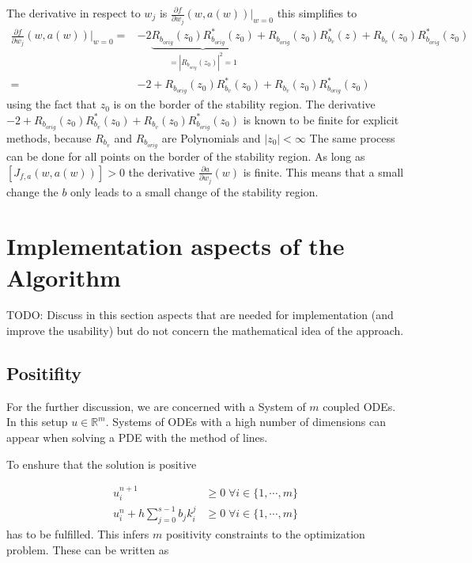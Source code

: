 \documentclass[a4paper]{scrartcl}
\numberwithin{equation}{section}
\theoremstyle{plain}
\theoremstyle{definition}
\numberwithin{theorem}{section}
\newcommand{\R}{\mathbb{R}}
\newcommand{\1}{\mathbbm{1}}
\begin{document}
The derivative in respect to $w_j$ is 
$ \frac{\partial f}{\partial w_j}(w,a(w)) \Big|_{w=0}$
this simplifies to 
\begin{align*}\label{eq:derivative_to_b}
 \frac{\partial f}{\partial w_j}(w,a(w)) \Big|_{w=0} =&
- 2 \underbrace{R_{b_{orig}}(z_0)R^*_{b_{orig}}(z_0)}_{=|R_{b_{orig}}(z_0)|^2=1} + R_{b_{orig}}(z_0)R^*_{b_v}(z) + R_{b_v}(z_0)R^*_{b_{orig}}(z_0) \\
=& -2 + R_{b_{orig}}(z_0)R^*_{b_v}(z_0) + R_{b_v}(z_0)R^*_{b_{orig}}(z_0)
\end{align*}
using the fact that $z_0$ is on the border of the stability region.
The derivative $-2 + R_{b_{orig}}(z_0)R^*_{b_v}(z_0) + R_{b_v}(z_0)R^*_{b_{orig}}(z_0)$ is known to be finite for explicit methods, because $R_{b_v}$ and $R_{b_{orig}}$ are Polynomials and $|z_0| < \infty$
The same process can be done for all points on the border of the stability region. 
As long as $\left[ J_{f,a}(w,a(w))  \right] > 0$ the derivative $\frac{\partial a}{\partial w_j} (w)$ is finite. This means that a small change the $b$ only leads to a small change of the stability region.


\section{Implementation aspects of the Algorithm}\label{sec:imple}

TODO: Discuss in this section aspects that are needed for implementation (and improve the usability) but do not concern the mathematical idea of the approach.

\subsection{Positifity}


For the further discussion, we are concerned with a System of $m$ coupled ODEs. 
In this setup $u \in \R^m$.
Systems of ODEs with a high number of dimensions can appear when solving a PDE with the method of lines.

To enshure that the solution is positive 

\begin{align}
 u_i^{n+1} &\geq 0   \;   \forall {i \in \{1, \cdots,m \}}  \\
 u_i^n + h \sum_{j=0}^{s-1} b_j k_i^j  &\geq 0   \;   \forall {i \in \{1,\cdots,m \}}  
\end{align}
has to be fulfilled.
This infers $m$ positivity constraints to the optimization problem. These can be written as
\end{document}
